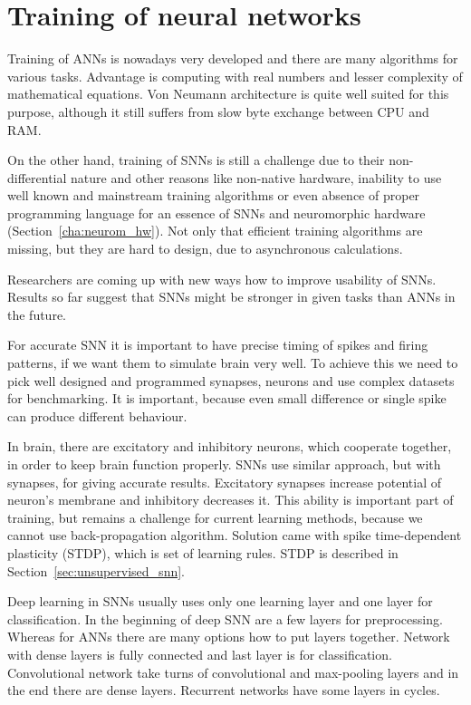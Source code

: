 \chapter{Training of neural networks}%
\label{cha:training_nns}

Training of ANNs is nowadays very developed and there are many algorithms for various tasks. Advantage is computing with real numbers and lesser complexity of mathematical equations. Von Neumann architecture is quite well suited for this purpose, although it still suffers from slow byte exchange between CPU and RAM.

On the other hand, training of SNNs is still a challenge due to their non-differential nature and other reasons like non-native hardware, inability to use well known and mainstream training algorithms or even absence of proper programming language for an essence of SNNs and neuromorphic hardware (Section~\ref{cha:neurom_hw}). Not only that efficient training algorithms are missing, but they are hard to design, due to asynchronous calculations. \cite{dl-with-sneurons}

Researchers are coming up with new ways how to improve usability of SNNs. Results so far suggest that SNNs might be stronger in given tasks than ANNs in the future. \cite{dl-in-snns}

For accurate SNN it is important to have precise timing of spikes and firing patterns, if we want them to simulate brain very well. To achieve this we need to pick well designed and programmed synapses, neurons and use complex datasets for benchmarking. It is important, because even small difference or single spike can produce different behaviour. \cite{dl-with-sneurons}

In brain, there are excitatory and inhibitory neurons, which cooperate together, in order to keep brain function properly. SNNs use similar approach, but with synapses, for giving accurate results. Excitatory synapses increase potential of neuron's membrane and inhibitory decreases it. This ability is important part of training, but remains a challenge for current learning methods, because we cannot use back-propagation algorithm. Solution came with spike time-dependent plasticity (STDP), which is set of learning rules. STDP is described in Section~\ref{sec:unsupervised_snn}.

Deep learning in SNNs usually uses only one learning layer and one layer for classification. In the beginning of deep SNN are a few layers for preprocessing. Whereas for ANNs there are many options how to put layers together. Network with dense layers is fully connected and last layer is for classification. Convolutional network take turns of convolutional and max-pooling layers and in the end there are dense layers. Recurrent networks have some layers in cycles.


